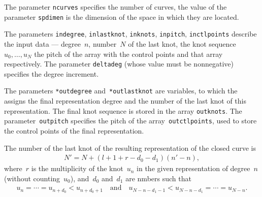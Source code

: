 The parameter \texttt{ncurves} specifies the number of curves,
the value of the parameter \texttt{spdimen} is the dimension of the space
in which they are located.

\begin{sloppypar}
The parameters \texttt{indegree},
\texttt{inlastknot}, \texttt{inknots}, \texttt{inpitch}, \texttt{inctlpoints}
describe the input data --- degree~$n$, number~$N$ of the last knot,
the knot sequence~$u_0,\ldots,u_N$ the pitch of the array with the control
points and that array respectively. The parameter \texttt{deltadeg} (whose value
must be nonnegative) specifies the degree increment.%
\end{sloppypar}

The parameters \texttt{*outdegree} and~\texttt{*outlastknot} are variables,
to which the assigns the final representation degree and the number
of the last knot of this representation.
The final knot sequence is stored in the array \texttt{outknots}.
The parameter~\texttt{outpitch} specifies the pitch of the
array~\texttt{outctlpoints}, used to store the control points of the
final representation.

The number of the last knot of the resulting representation of the closed
curve is
\begin{align*}
  N' = N+(l+1+r-d_0-d_1)(n'-n),
\end{align*}
where~$r$ is the multiplicity of the knot~$u_n$ in the given representation
of degree~$n$ (without counting~$u_0$), and~$d_0$ and~$d_1$ are nmbers such that
\begin{align*}
  u_n=\cdots=u_{n+d_0}<u_{n+d_0+1}\quad\mbox{and}\quad
  u_{N-n-d_1-1}<u_{N-n-d_1}=\cdots=u_{N-n}.
\end{align*}

